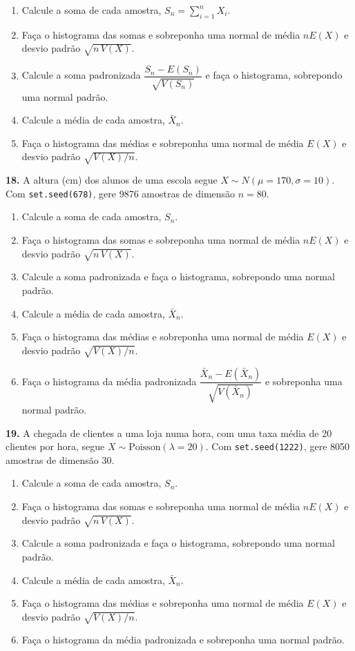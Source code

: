 \documentclass[
  portuguese,
  11pt,
  openany]{book}
\providecommand{\tightlist}{%
  \setlength{\itemsep}{0pt}\setlength{\parskip}{0pt}}
\begin{document}
\begin{enumerate}
\def\labelenumi{(\alph{enumi})}
\tightlist
\item
  Calcule a soma de cada amostra, \(S_n = \sum_{i=1}^n X_i\).
\item
  Faça o histograma das somas e sobreponha uma normal de média \(nE(X)\) e desvio padrão
  \(\sqrt{n\,V(X)}\).
\item
  Calcule a soma padronizada \(\dfrac{S_n - E(S_n)}{\sqrt{V(S_n)}}\) e faça o histograma,
  sobrepondo uma normal padrão.
\item
  Calcule a média de cada amostra, \(\bar{X}_n\).
\item
  Faça o histograma das médias e sobreponha uma normal de média \(E(X)\) e desvio padrão
  \(\sqrt{V(X)/n}\).
\end{enumerate}

\textbf{18.} A altura (cm) dos alunos de uma escola segue \(X \sim N(\mu = 170, \sigma = 10)\).
Com \texttt{set.seed(678)}, gere 9876 amostras de dimensão \(n = 80\).

\begin{enumerate}
\def\labelenumi{(\alph{enumi})}
\tightlist
\item
  Calcule a soma de cada amostra, \(S_n\).
\item
  Faça o histograma das somas e sobreponha uma normal de média \(nE(X)\) e desvio padrão
  \(\sqrt{n\,V(X)}\).
\item
  Calcule a soma padronizada e faça o histograma, sobrepondo uma normal padrão.
\item
  Calcule a média de cada amostra, \(\bar{X}_n\).
\item
  Faça o histograma das médias e sobreponha uma normal de média \(E(X)\) e desvio padrão
  \(\sqrt{V(X)/n}\).
\item
  Faça o histograma da média padronizada
  \(\dfrac{\bar{X}_n - E(\bar{X}_n)}{\sqrt{V(\bar{X}_n)}}\) e sobreponha uma normal
  padrão.
\end{enumerate}

\textbf{19.} A chegada de clientes a uma loja numa hora, com uma taxa média de 20 clientes por
hora, segue \(X \sim \text{Poisson}(\lambda = 20)\). Com \texttt{set.seed(1222)}, gere 8050
amostras de dimensão 30.

\begin{enumerate}
\def\labelenumi{(\alph{enumi})}
\tightlist
\item
  Calcule a soma de cada amostra, \(S_n\).
\item
  Faça o histograma das somas e sobreponha uma normal de média \(nE(X)\) e desvio padrão
  \(\sqrt{n\,V(X)}\).
\item
  Calcule a soma padronizada e faça o histograma, sobrepondo uma normal padrão.
\item
  Calcule a média de cada amostra, \(\bar{X}_n\).
\item
  Faça o histograma das médias e sobreponha uma normal de média \(E(X)\) e desvio padrão
  \(\sqrt{V(X)/n}\).
\item
  Faça o histograma da média padronizada e sobreponha uma normal padrão.
\end{enumerate}
\end{document}
